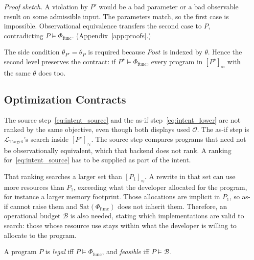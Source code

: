 \noindent\emph{Proof sketch.} A violation by \(P'\) would be a bad parameter
or a bad observable result on some admissible input. The parameters match, so
the first case is impossible. Observational equivalence transfers the second
case to \(P\), contradicting \(P \models \Phi_{\text{func}}\).
(Appendix~\ref{app:proofs}.)

The side condition \(\theta_{P'} = \theta_P\) is required because
\(\mathit{Post}\) is indexed by \(\theta\). Hence the second level
preserves the contract: if \(P^\star \models \Phi_{\text{func}}\), every
program in \([P^\star]_\approx\) with the same \(\theta\) does too.

\subsection{Optimization Contracts}
\label{sec:opt_contract}

The source step~\eqref{eq:intent_source} and the as-if
step~\eqref{eq:intent_lower} are not ranked by the same objective, even
though both displays used \(\mathcal{O}\). The as-if step is
\(\mathcal{L}_{\text{Target}}\)'s search inside \([P^\star]_\approx\).
The source step compares programs that need not be observationally
equivalent, which that backend does not rank. A ranking
for~\eqref{eq:intent_source} has to be supplied as part of the intent.

That ranking searches a larger set than \([P_1]_\approx\). A rewrite in
that set can use more resources than \(P_1\), exceeding what the developer
allocated for the program, for instance a larger memory footprint. Those
allocations are implicit in \(P_1\), so as-if cannot raise them and
\(\mathrm{Sat}(\Phi_{\text{func}})\) does not inherit them. Therefore, an
operational budget \(\mathcal{B}\) is also needed, stating which
implementations are valid to search: those whose resource use stays within
what the developer is willing to allocate to the program.

\begin{definition}
\label{def:legal}
A program \(P\) is \emph{legal} iff \(P \models \Phi_{\text{func}}\), and
\emph{feasible} iff \(P \models \mathcal{B}\).
\end{definition}

